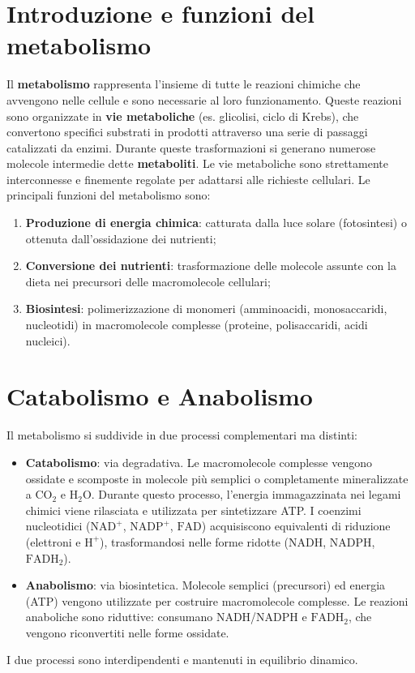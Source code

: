 \documentclass[12pt,a4paper]{report}
\begin{document}
\section{Introduzione e funzioni del metabolismo}
Il \textbf{metabolismo} rappresenta l'insieme di tutte le reazioni chimiche che avvengono nelle cellule e sono necessarie al loro funzionamento. Queste reazioni sono organizzate in \textbf{vie metaboliche} (es. glicolisi, ciclo di Krebs), che convertono specifici substrati in prodotti attraverso una serie di passaggi catalizzati da enzimi. Durante queste trasformazioni si generano numerose molecole intermedie dette \textbf{metaboliti}. Le vie metaboliche sono strettamente interconnesse e finemente regolate per adattarsi alle richieste cellulari.
Le principali funzioni del metabolismo sono:
\begin{enumerate}
\item \textbf{Produzione di energia chimica}: catturata dalla luce solare (fotosintesi) o ottenuta dall'ossidazione dei nutrienti;
\item \textbf{Conversione dei nutrienti}: trasformazione delle molecole assunte con la dieta nei precursori delle macromolecole cellulari;
\item \textbf{Biosintesi}: polimerizzazione di monomeri (amminoacidi, monosaccaridi, nucleotidi) in macromolecole complesse (proteine, polisaccaridi, acidi nucleici).
\end{enumerate}

\section{Catabolismo e Anabolismo}
Il metabolismo si suddivide in due processi complementari ma distinti:
\begin{itemize}
\item \textbf{Catabolismo}: via degradativa. Le macromolecole complesse vengono ossidate e scomposte in molecole più semplici o completamente mineralizzate a \(\mathrm{CO_2}\) e \(\mathrm{H_2O}\). Durante questo processo, l'energia immagazzinata nei legami chimici viene rilasciata e utilizzata per sintetizzare ATP. I coenzimi nucleotidici (\(\mathrm{NAD^+}\), \(\mathrm{NADP^+}\), \(\mathrm{FAD}\)) acquisiscono equivalenti di riduzione (elettroni e \(\mathrm{H^+}\)), trasformandosi nelle forme ridotte (\(\mathrm{NADH}\), \(\mathrm{NADPH}\), \(\mathrm{FADH_2}\)).
\item \textbf{Anabolismo}: via biosintetica. Molecole semplici (precursori) ed energia (ATP) vengono utilizzate per costruire macromolecole complesse. Le reazioni anaboliche sono riduttive: consumano \(\mathrm{NADH}\)/\(\mathrm{NADPH}\) e \(\mathrm{FADH_2}\), che vengono riconvertiti nelle forme ossidate.
\end{itemize}
I due processi sono interdipendenti e mantenuti in equilibrio dinamico.
\end{document}
